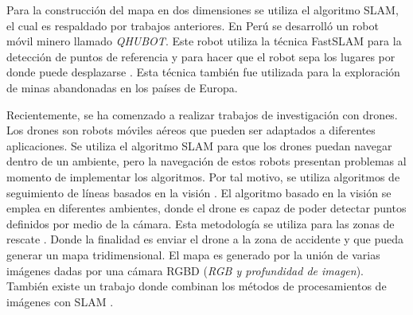Para la construcción del mapa en dos dimensiones se utiliza el algoritmo SLAM, el cual es 
respaldado por trabajos anteriores. En Perú se desarrolló un robot móvil minero
llamado \textit{QHUBOT}. Este robot utiliza la técnica FastSLAM para la detección de puntos
de referencia y para hacer que el robot sepa los lugares por donde puede desplazarse 
\cite{Mauricio2015}. Esta técnica también fue utilizada para la exploración de minas 
abandonadas en los países de Europa.


Recientemente, se ha comenzado a realizar trabajos de investigación con drones. Los drones 
son robots móviles aéreos que pueden ser adaptados a diferentes aplicaciones. Se utiliza 
el algoritmo SLAM para que los drones puedan navegar dentro de un ambiente, pero la navegación
de estos robots presentan problemas al momento de implementar los algoritmos. Por tal motivo,
se utiliza algoritmos de seguimiento de líneas basados en la visión \cite{Verschoor2013}. El
algoritmo basado en la visión se emplea en diferentes ambientes, donde el drone es capaz de 
poder detectar puntos definidos por medio de la cámara. Esta metodología se utiliza para
las zonas de rescate \cite{Skoda2015}. Donde la finalidad es enviar el drone a la
zona de accidente y que pueda generar un mapa tridimensional. El mapa es generado por la unión de
varias imágenes dadas por una cámara RGBD (\textit{RGB y profundidad de imagen}). También existe
un trabajo donde combinan los métodos de procesamientos de imágenes con SLAM \cite{Heukels2015}.


